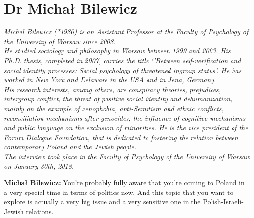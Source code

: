 \section{Dr Michał Bilewicz}

\textit{Michał Bilewicz (*1980) is an Assistant Professor at the Faculty of Psychology of the University of Warsaw since 2008. \\
He studied sociology and philosophy in Warsaw between 1999 and 2003. His Ph.D. thesis, completed in 2007, carries the title `'Between self-verification and social identity processes: Social psychology of threatened ingroup status'. 
He has worked in New York and Delaware in the USA and in Jena, Germany. \\
His research interests, among others, are conspiracy theories, prejudices, intergroup conflict, the threat of positive social identity and dehumanization, mainly on the example of xenophobia, anti-Semitism and ethnic conflicts, reconciliation mechanisms after genocides, the influence of cognitive mechanisms and public language on the exclusion of minorities.
He is the vice president of the Forum Dialogue Foundation, that is dedicated to fostering the relation between contemporary Poland and the Jewish people. \\
The interview took place in the Faculty of Psychology of the University of Warsaw on January 30th, 2018.}\par
\vspace*{2em}
\textbf{Michał Bilewicz:} You're probably fully aware that you're coming to Poland in a very special time in terms of politics now. And this topic that you want to explore is actually a very big issue and a very sensitive one in the Polish-Israeli-Jewish relations.\\
